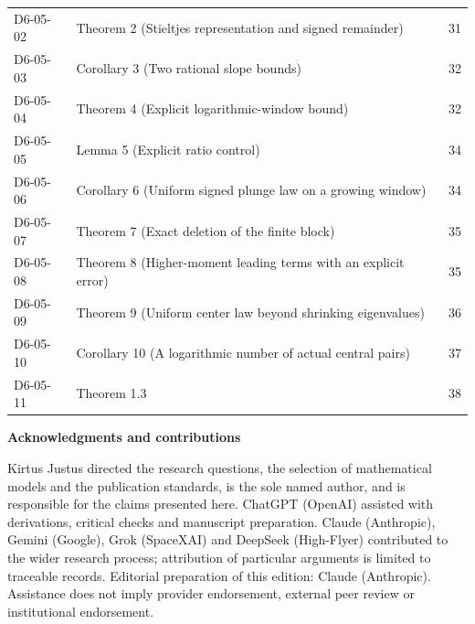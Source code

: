 \documentclass[11pt,a4paper]{article}
\begin{document}
{\begin{longtable}{@{}l>{\raggedright\arraybackslash}p{}r@{}}
D6-05-02 & Theorem 2 (Stieltjes representation and signed remainder) & 31\\
D6-05-03 & Corollary 3 (Two rational slope bounds) & 32\\
D6-05-04 & Theorem 4 (Explicit logarithmic-window bound) & 32\\
D6-05-05 & Lemma 5 (Explicit ratio control) & 34\\
D6-05-06 & Corollary 6 (Uniform signed plunge law on a growing window) & 34\\
D6-05-07 & Theorem 7 (Exact deletion of the finite block) & 35\\
D6-05-08 & Theorem 8 (Higher-moment leading terms with an explicit error) & 35\\
D6-05-09 & Theorem 9 (Uniform center law beyond shrinking eigenvalues) & 36\\
D6-05-10 & Corollary 10 (A logarithmic number of actual central pairs) & 37\\
D6-05-11 & Theorem 1.3 & 38\\
\bottomrule\end{longtable}}
\vspace{3mm}\textbf{Acknowledgments and contributions}\par
{\small Kirtus Justus directed the research questions, the selection of mathematical models and the publication standards, is the sole named author, and is responsible for the claims presented here. ChatGPT (OpenAI) assisted with derivations, critical checks and manuscript preparation. Claude (Anthropic), Gemini (Google), Grok (SpaceXAI) and DeepSeek (High-Flyer) contributed to the wider research process; attribution of particular arguments is limited to traceable records. Editorial preparation of this edition: Claude (Anthropic). Assistance does not imply provider endorsement, external peer review or institutional endorsement.\par}
\end{document}
